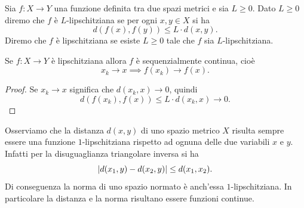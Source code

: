\begin{definition}[lipschitz]
\mymark{***}
Sia $f\colon X \to Y$ una funzione definita tra due spazi metrici e sia $L\ge 0$.
Dato $L\ge 0$
diremo che $f$ è $L$-lipschitziana se
per ogni $x,y \in X$ si ha
\[
  d(f(x),f(y)) \le L \cdot d(x,y).
\]
Diremo che $f$ è lipschitziana se esiste $L\ge 0$ tale che $f$ sia $L$-lipschitziana.
\end{definition}

\begin{theorem}
\label{th:lipschitz_uniformemente_continua}%
\mymark{*}%
Se $f\colon X \to Y$ è lipschitziana allora
$f$ è sequenzialmente continua, cioè
\[
  x_k \to x \implies f(x_k)\to f(x).
\]
\end{theorem}
%
\begin{proof}
Se $x_k\to x$ significa che $d(x_k,x) \to 0$, quindi
\[
  d(f(x_k), f(x)) \le L \cdot d(x_k,x) \to 0.
\]
\end{proof}

Osserviamo che la distanza $d(x,y)$ di uno spazio metrico $X$ risulta sempre essere una funzione $1$-lip\-schit\-zia\-na rispetto ad ognuna delle due variabili $x$ e $y$. Infatti per la disuguaglianza triangolare inversa si ha
\[
  {\left|d(x_1,y) - d(x_2,y)\right|} \le d(x_1, x_2).
\]
Di conseguenza la norma di uno spazio normato è anch'essa $1$-lip\-schit\-zia\-na. 
In particolare la distanza e la norma risultano essere funzioni continue.

